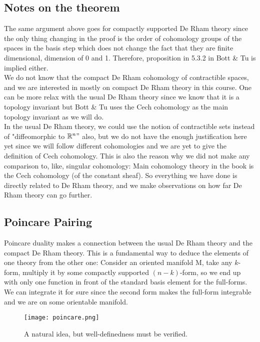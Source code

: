 \documentclass[12pt]{amsart}
\theoremstyle{remark}
\begin{document}
\subsection{Notes on the theorem}
\indent \indent The same argument above goes for compactly supported De Rham theory since the only thing changing in the proof is the order of cohomology groups of the spaces in the basis step which does not change the fact that they are finite dimensional, dimension of 0 and 1. Therefore, proposition in 5.3.2 in Bott \& Tu is implied either. \\
\indent We do not know that the compact De Rham cohomology of contractible spaces, and we are interested in mostly on compact De Rham theory in this course. One can be more relax with the usual De Rham theory since we know that it is a topology invariant but Bott \& Tu uses the Cech cohomology as the main topology invariant as we will do. \\
\indent In the usual De Rham theory, we could use the notion of contractible sets instead of "diffeomorphic to $\mathbb{R}^n"$ also, but we do not have the enough justification here yet since we will follow different cohomologies and we are yet to give the definition of Cech cohomology. This is also the reason why we did not make any comparison to, like, singular cohomology: Main cohomology theory in the book is the Cech cohomology (of the constant sheaf). So everything we have done is directly related to De Rham theory, and we make observations on how far De Rham theory can go further.\\

\subsection{Poincare Pairing} \indent Poincare duality makes a connection between the usual De Rham theory and the compact De Rham theory. This is a fundamental way to deduce the elements of one theory from the other one: Consider an oriented manifold M, take any $k$-form, multiply it by some compactly supported $(n-k)$-form, so we end up with only one function in front of the standard basis element for the full-forms. We can integrate it for sure since the second form makes the full-form integrable and we are on some orientable manifold. 

\begin{figure}[h]
    \centering
    \texttt{[image: poincare.png]}
    \caption{A natural idea, but well-definedness must be verified.}
    \label{fig:oh}
\end{figure}
\end{document}
